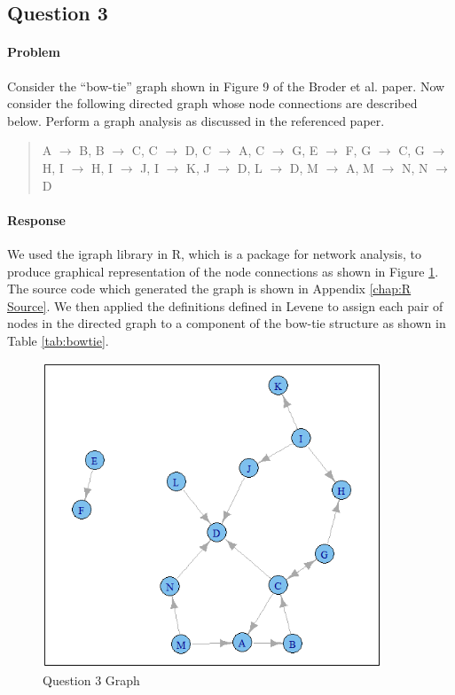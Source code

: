 \documentclass[letterpaper,11pt]{report}
\begin{document}
\begin{savenotes}
\subsection{Question 3}
\paragraph{Problem}Consider the ``bow-tie'' graph shown in Figure 9 of the Broder et al. \cite{broder2000graph} paper. Now consider the following directed graph whose node connections are described below. Perform a graph analysis as discussed in the referenced paper.
\begin{quote}
A $\rightarrow$ B, B $\rightarrow$ C, C $\rightarrow$ D, C $\rightarrow$ A, C $\rightarrow$ G, E $\rightarrow$ F, G $\rightarrow$ C, G $\rightarrow$ H, I $\rightarrow$ H, I $\rightarrow$ J, I $\rightarrow$ K, J $\rightarrow$ D, L $\rightarrow$ D, M $\rightarrow$ A, M $\rightarrow$ N, N $\rightarrow$ D
\end{quote}

\paragraph{Response}We used the igraph library in R, which is a package for network analysis, to produce graphical representation of the node connections as shown in Figure \ref{fig:Q3-Graph}. The source code which generated the graph is shown in Appendix \ref{chap:R Source}. We then applied the definitions defined in Levene \cite{levene2011introduction} to assign each pair of nodes in the directed graph to a component of the bow-tie structure as shown in Table \ref{tab:bowtie}.

\begin{figure}[htbp]
	\centering
		\includegraphics[width=0.90\textwidth]{Q3-Graph.png}
	\caption{Question 3 Graph}
	\label{fig:Q3-Graph}
\end{figure}


\end{savenotes}
\end{document}
